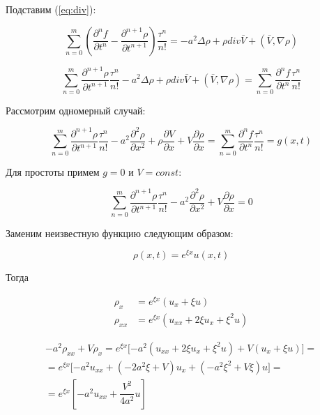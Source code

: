 Подставим (\ref{eq:div}):

\begin{equation}
\sum\limits_{n=0}^{m} \left(\dfrac{\partial^n f}{\partial t^n} - \dfrac{\partial^{n+1} \rho}{\partial t^{n+1}} \right) \dfrac{\tau^n}{n!} = - a^2 \Delta \rho + \rho div\bar{V} + (\bar{V},\nabla \rho)
\end{equation}

\begin{equation}
\sum\limits_{n=0}^{m} \dfrac{\partial^{n+1} \rho}{\partial t^{n+1}} \dfrac{\tau^n}{n!} - a^2 \Delta \rho + \rho div\bar{V} + (\bar{V},\nabla \rho) = \sum\limits_{n=0}^{m} \dfrac{\partial^n f}{\partial t^n} \dfrac{\tau^n}{n!}
\end{equation}

Рассмотрим одномерный случай:

\begin{equation}
\sum\limits_{n=0}^{m} \dfrac{\partial^{n+1} \rho}{\partial t^{n+1}} \dfrac{\tau^n}{n!} - a^2 \dfrac{\partial^2 \rho}{\partial x^2} + \rho \dfrac{\partial V}{\partial x} + V \dfrac{\partial \rho}{\partial x} = \sum\limits_{n=0}^{m} \dfrac{\partial^n f}{\partial t^n} \dfrac{\tau^n}{n!} = g(x,t)
\end{equation}

Для простоты примем $g=0$ и $V=const$:

\begin{equation}
\sum\limits_{n=0}^{m} \dfrac{\partial^{n+1} \rho}{\partial t^{n+1}} \dfrac{\tau^n}{n!} - a^2 \dfrac{\partial^2 \rho}{\partial x^2} + V \dfrac{\partial \rho}{\partial x} = 0
\end{equation}

Заменим неизвестную функцию следующим образом:

\begin{equation}
\rho (x,t) = e^{\xi x} u(x,t)
\end{equation}

Тогда

\begin{align}
\rho_x & = e^{\xi x} (u_x + \xi u)\\
\rho_{xx} & = e^{\xi x} (u_{xx} + 2 \xi u_x + \xi^2 u)
\end{align}

\begin{align}
- a^2 \rho_{xx} + V \rho_x = e^{\xi x} \lbrack -a^2 (u_{xx} + 2 \xi u_x + \xi^2 u) + V (u_x + \xi u) \rbrack = \\
= e^{\xi x} \lbrack -a^2 u_{xx} + (-2 a^2 \xi + V) u_x + (-a^2 \xi^2 + V \xi) u \rbrack = \\
= e^{\xi x} \left\lbrack -a^2 u_{xx} + \dfrac{V^2}{4a^2} u \right\rbrack
\end{align}


